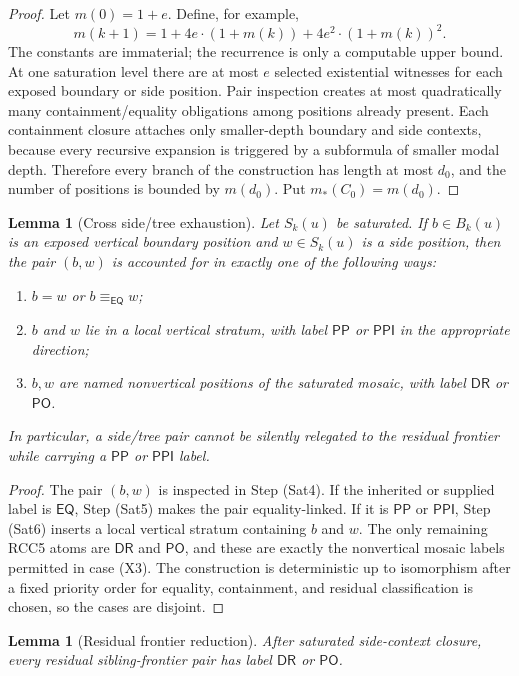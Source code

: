 \documentclass[11pt]{article}
\newtheorem{lemma}[theorem]{Lemma}
\newcommand{\EQ}{\mathsf{EQ}}
\newcommand{\DR}{\mathsf{DR}}
\newcommand{\PO}{\mathsf{PO}}
\newcommand{\PP}{\mathsf{PP}}
\newcommand{\PPI}{\mathsf{PPI}}
\newcommand{\eqc}{\equiv_{\EQ}}
\begin{document}
\begin{proof}
Let $m(0)=1+e$.  Define, for example,
\[
  m(k+1)=1+4e\cdot(1+m(k))+4e^2\cdot(1+m(k))^2 .
\]
The constants are immaterial; the recurrence is only a computable upper bound.  At one saturation level there are at most $e$ selected existential witnesses for each exposed boundary or side position.  Pair inspection creates at most quadratically many containment/equality obligations among positions already present.  Each containment closure attaches only smaller-depth boundary and side contexts, because every recursive expansion is triggered by a subformula of smaller modal depth.  Therefore every branch of the construction has length at most $d_0$, and the number of positions is bounded by $m(d_0)$.  Put $m_*(C_0)=m(d_0)$.
\end{proof}

\begin{lemma}[Cross side/tree exhaustion]\label{lem:cross-side-tree}
Let $S_k(u)$ be saturated.  If $b\in B_k(u)$ is an exposed vertical boundary position and $w\in S_k(u)$ is a side position, then the pair $(b,w)$ is accounted for in exactly one of the following ways:
\begin{enumerate}[label=(X\arabic*)]
\item $b=w$ or $b\eqc w$;
\item $b$ and $w$ lie in a local vertical stratum, with label $\PP$ or $\PPI$ in the appropriate direction;
\item $b,w$ are named nonvertical positions of the saturated mosaic, with label $\DR$ or $\PO$.
\end{enumerate}
In particular, a side/tree pair cannot be silently relegated to the residual frontier while carrying a $\PP$ or $\PPI$ label.
\end{lemma}

\begin{proof}
The pair $(b,w)$ is inspected in Step (Sat4).  If the inherited or supplied label is $\EQ$, Step (Sat5) makes the pair equality-linked.  If it is $\PP$ or $\PPI$, Step (Sat6) inserts a local vertical stratum containing $b$ and $w$.  The only remaining RCC5 atoms are $\DR$ and $\PO$, and these are exactly the nonvertical mosaic labels permitted in case (X3).  The construction is deterministic up to isomorphism after a fixed priority order for equality, containment, and residual classification is chosen, so the cases are disjoint.
\end{proof}

\begin{lemma}[Residual frontier reduction]\label{lem:residual-frontier}
After saturated side-context closure, every residual sibling-frontier pair has label $\DR$ or $\PO$.
\end{lemma}
\end{document}
